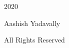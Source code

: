 \thispagestyle{empty}

\begin{center}
    \vspace*{18\baselineskip}
    \textcopyright \hspace{0.05cm} 2020
    
    Aashish Yadavally
    
    All Rights Reserved
\end{center}

\newpage